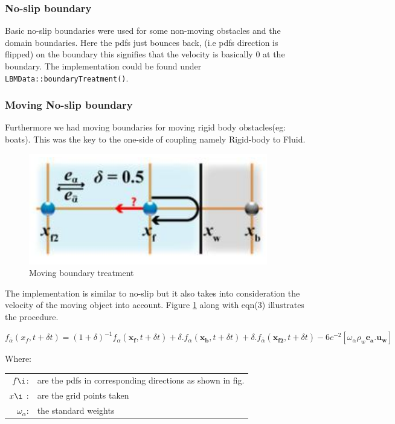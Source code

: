 \subsubsection *{No-slip boundary}
  Basic no-slip boundaries were used for some non-moving obstacles and the domain boundaries. Here the pdfs just bounces back, (i.e pdfs direction is flipped) on the boundary this signifies that the velocity is basically 0 at the boundary. The implementation could be found under \texttt{LBMData::boundaryTreatment()}.


\subsubsection *{ Moving No-slip boundary}
Furthermore we had moving boundaries for moving rigid body obstacles(eg: boats). This was the key to the one-side of coupling namely Rigid-body to Fluid. 
\begin{figure}[ht]
	\centering
	\includegraphics[scale=0.5]{img/LBM/moving_boundary.png}
	\caption{Moving boundary treatment}
	\label{fig: Moving boundary}
\end{figure} 
 The implementation is similar to no-slip but it also takes into consideration the velocity of the moving object into account. Figure \ref{fig: Moving boundary} along with eqn(3) illustrates the procedure. 

	 \begin{equation}
	f_{\bar{\alpha}}(x_f , t + \delta t) = (1+\delta)^{-1} f_\alpha(\boldsymbol{x_f}, t+\delta t)
	+ \delta.f_\alpha(\boldsymbol{x_b}, t+\delta t) + \delta . f_{\bar{\alpha}}(\boldsymbol{x_{f2}}, t+\delta t) - 6c^{-2}[\omega_{\alpha}\rho_w \boldsymbol{e_a.u_w}]
	\end{equation}


Where:\\
\hspace*{3em}
\begin{tabular}{rl}
	$f\i$:& are the pdfs in corresponding directions as shown in fig. \\
	$x\i$ :& are the grid points taken \\
    $\omega_{\alpha}$:& the standard weights \\
\end{tabular}

